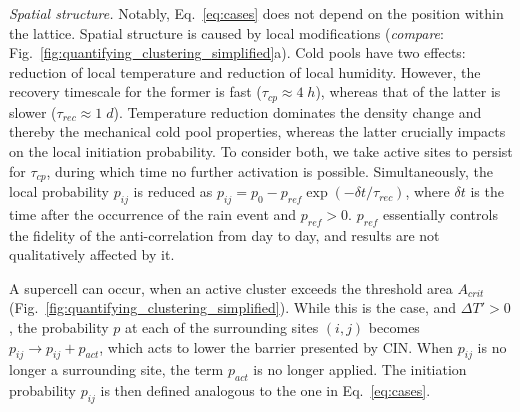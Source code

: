 \documentclass[draft,linenumbers]{agujournal2019}
\begin{document}
\noindent
{\it Spatial structure.} 
Notably, Eq.~\ref{eq:cases} does not depend on the position within the lattice. 
Spatial structure is caused by local modifications ({\it compare}: Fig.~\ref{fig:quantifying_clustering_simplified}a).
Cold pools have two effects: reduction of local temperature and reduction of local humidity. 
However, the recovery timescale for the former is fast ($\tau_{cp}\approx 4\;h$), whereas that of the latter is slower ($\tau_{rec}\approx 1\;d$).
Temperature reduction dominates the density change and thereby the mechanical cold pool properties, whereas the latter crucially impacts on the local initiation probability.
To consider both, we take active sites to persist for $\tau_{cp}$, during which time no further activation is possible.
Simultaneously, the local probability $p_{ij}$ is reduced as $p_{ij}=p_0-p_{ref}\exp(-\delta t/\tau_{rec})$, where $\delta t$ is the time after the occurrence of the rain event and $p_{ref}>0$. 
$p_{ref}$ essentially controls the fidelity of the anti-correlation from day to day, and results are not qualitatively affected by it.

A supercell can occur, when an active cluster exceeds the threshold area $A_{crit}$ (Fig.~\ref{fig:quantifying_clustering_simplified}). 
While this is the case, and $\Delta T'>0$, the probability $p$ at each of the surrounding sites $(i,j)$ becomes $p_{ij}\rightarrow p_{ij}+p_{act}$, which acts to lower the barrier presented by CIN.
When $p_{ij}$ is no longer a surrounding site, the term $p_{act}$ is no longer applied.
The initiation probability $p_{ij}$ is then defined analogous to the one in Eq.~\ref{eq:cases}. 
\end{document}
